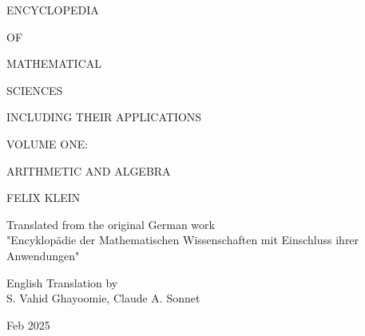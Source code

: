 \documentclass{book}
\begin{document}

\begin{center}
\vspace*{1cm}
{\fontsize{36}{42}\selectfont ENCYCLOPEDIA}

\vspace{0.5cm}
{\fontsize{24}{30}\selectfont OF}

\vspace{0.5cm}
{\fontsize{36}{42}\selectfont MATHEMATICAL}

\vspace{0.5cm}
{\fontsize{36}{42}\selectfont SCIENCES}

\vspace{1cm}
{\fontsize{18}{22}\selectfont INCLUDING THEIR APPLICATIONS}

\vspace{2cm}
{\fontsize{20}{26}\selectfont VOLUME ONE:}

\vspace{0.5cm}
{\fontsize{24}{30}\selectfont ARITHMETIC AND ALGEBRA}

\vspace{1.0cm}
{\fontsize{18}{22}\selectfont FELIX KLEIN}

\vspace{0.8cm}
{\fontsize{14}{16}\selectfont Translated from the original German work\\
"Encyklopädie der Mathematischen Wissenschaften mit Einschluss ihrer Anwendungen"}

\vspace{0.8cm}
{\fontsize{14}{20}\selectfont English Translation by\\[0.3cm]
S. Vahid Ghayoomie, Claude A. Sonnet}

\vspace{0.5cm}
{\fontsize{12}{20}\selectfont Feb 2025}

\end{center}




\cleardoublepage
\end{document}
